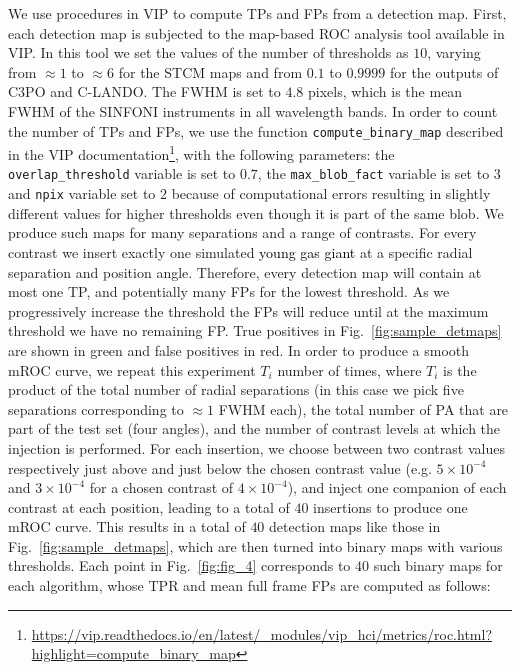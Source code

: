 \documentclass{aa}
\newcommand{\newchange}[1]{\textcolor{black}{#1}}
\begin{document}
We use procedures in VIP \citep{2017AJGomezVIP,2023Christiaens} to compute TPs and FPs from a detection map. First, each detection map is subjected to the map-based ROC analysis tool available in VIP. In this tool we set the values of the number of thresholds as $10$, varying from $\approx 1$ to $\approx 6$ for the STCM maps and from $0.1$ to $0.9999$ for the outputs of C3PO and C-LANDO. The FWHM is set to $4.8$ pixels, which is the mean FWHM of the SINFONI instruments in all wavelength bands. 
In order to count the number of TPs and FPs, we use the function \texttt{compute\_binary\_map} described in the VIP documentation\footnote{\url{https://vip.readthedocs.io/en/latest/_modules/vip_hci/metrics/roc.html?highlight=compute_binary_map}}, with the following parameters: the \texttt{overlap\_threshold} variable is set to $0.7$, the \texttt{max\_blob\_fact} variable is set to $3$ and \texttt{npix} variable set to $2$ because of computational errors resulting in slightly different values for higher thresholds even though it is part of the same blob.
We produce such maps for many separations and a range of contrasts.
For every contrast we insert exactly one simulated \newchange{young gas giant} at a specific radial separation and position angle.
Therefore, every detection map will contain at most one TP, and potentially many FPs for the lowest threshold. 
As we progressively increase the threshold the FPs will reduce until at the maximum threshold we have no remaining FP. 
True positives in Fig.~\ref{fig:sample_detmaps} are shown in green and false positives in red.
In order to produce a smooth mROC curve, we repeat this experiment $T_{i}$ number of times, where $T_{i}$ is the product of the total number of radial separations (in this case we pick five separations corresponding to $\approx 1$ FWHM each), the total number of PA that are part of the test set (four angles), and the number of contrast levels at which the injection is performed.
For each insertion, we choose between two contrast values respectively just above and just below the chosen contrast value (e.g. $5\times10^{-4}$ and $3\times10^{-4}$ for a chosen contrast of $4\times10^{-4}$), and inject one companion of each contrast at each position, leading to a total of $40$ insertions to produce one mROC curve.
This results in a total of $40$ detection maps like those in Fig.~\ref{fig:sample_detmaps}, which are then turned into binary maps with various thresholds. 
Each point in Fig.~\ref{fig:fig_4} corresponds to $40$ such binary maps for each algorithm, whose TPR and mean full frame FPs are computed as follows:
\end{document}
